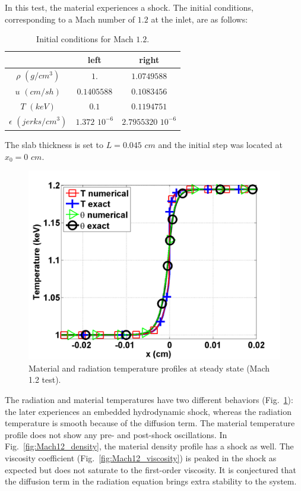 \documentclass[review]{elsarticle}
\newcommand{\fig}[1]{Fig.~\ref{#1}}                      %
\begin{document}
In this test, the material experiences a shock. The initial conditions, corresponding to a Mach number of $1.2$ at the inlet, are as follows: 
\begin{table}[H]
\caption{\label{tbl:table4} Initial conditions for Mach $1.2$.}
\begin{center}
\begin{tabular}{|c|c|c|}
\hline 
 & left  & right \\ \hline
$\rho$ $(g/cm^3)$ &$1.$ & $1.0749588$ \\ \hline
$u$ $(cm/sh)$& $0.1405588$ & $0.1083456$ \\ \hline
$T$ $(keV)$& $0.1$ & $0.1194751$\\ \hline
$\epsilon$ $(jerks/cm^3)$ & $1.372$ $10^{-6}$ & $2.7955320$ $10^{-6}$\\
\hline
\end{tabular}  
\end{center}  
\end{table}
The slab thickness is set to $L=0.045$ $cm$ and the initial step was located at $x_0 = 0$ $cm$. 
\begin{figure}[H]
       \centering
       \includegraphics[width=\textwidth]{figs/Mach_1p2_nel_1000_temperature.png}
       \caption{Material and radiation temperature profiles at steady state (Mach 1.2 test).}\label{fig:Mach12_temp}
\end{figure}
The radiation and material temperatures have two different behaviors (\fig{fig:Mach12_temp}): the later experiences an embedded hydrodynamic shock, whereas the radiation temperature is smooth because of the diffusion term. The material temperature profile does not show any pre- and post-shock oscillations. In \fig{fig:Mach12_density}, the material density profile has a shock as well. The viscosity coefficient (\fig{fig:Mach12_viscosity}) is peaked in the shock as expected but does not saturate to the first-order viscosity. It is conjectured that the diffusion term in the radiation equation brings extra stability to the system. \\
\end{document}
